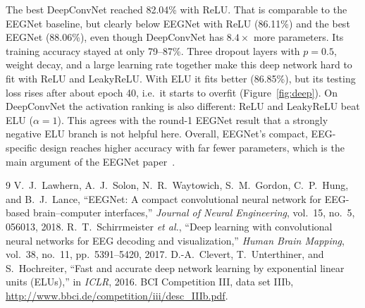 \documentclass[11pt,a4paper]{article}
\begin{document}
The best DeepConvNet reached 82.04\% with ReLU. That is comparable to the EEGNet baseline, but clearly below EEGNet with ReLU (86.11\%) and the best EEGNet (88.06\%), even though DeepConvNet has $8.4\times$ more parameters. Its training accuracy stayed at only 79--87\%. Three dropout layers with $p=0.5$, weight decay, and a large learning rate together make this deep network hard to fit with ReLU and LeakyReLU. With ELU it fits better (86.85\%), but its testing loss rises after about epoch 40, i.e.\ it starts to overfit (Figure~\ref{fig:deep}). On DeepConvNet the activation ranking is also different: ReLU and LeakyReLU beat ELU ($\alpha=1$). This agrees with the round-1 EEGNet result that a strongly negative ELU branch is not helpful here. Overall, EEGNet's compact, EEG-specific design reaches higher accuracy with far fewer parameters, which is the main argument of the EEGNet paper~\cite{eegnet}.

\begin{thebibliography}{9}
 V.~J.~Lawhern, A.~J.~Solon, N.~R.~Waytowich, S.~M.~Gordon, C.~P.~Hung, and B.~J.~Lance, ``EEGNet: A compact convolutional neural network for EEG-based brain--computer interfaces,'' \emph{Journal of Neural Engineering}, vol.~15, no.~5, 056013, 2018.
 R.~T.~Schirrmeister \emph{et al.}, ``Deep learning with convolutional neural networks for EEG decoding and visualization,'' \emph{Human Brain Mapping}, vol.~38, no.~11, pp.~5391--5420, 2017.
 D.-A.~Clevert, T.~Unterthiner, and S.~Hochreiter, ``Fast and accurate deep network learning by exponential linear units (ELUs),'' in \emph{ICLR}, 2016.
 BCI Competition III, data set IIIb, \url{http://www.bbci.de/competition/iii/desc_IIIb.pdf}.
\end{thebibliography}
\end{document}
